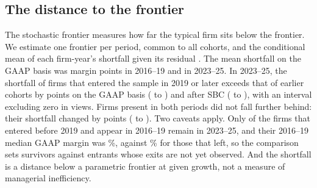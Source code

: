 \subsection{The distance to the frontier}
The stochastic frontier measures how far the typical firm sits below the frontier. We estimate one frontier per period, common to all cohorts, and the conditional mean of each firm-year's shortfall given its residual \citep{jondrow1982estimation}. The mean shortfall on the GAAP basis was \SfaEarly{} margin points in 2016--19 and \SfaLate{} in 2023--25. In 2023--25, the shortfall of firms that entered the sample in 2019 or later exceeds that of earlier cohorts by \SfaCohortOp{} points on the GAAP basis (\SfaCohortOpLo{} to \SfaCohortOpHi) and \SfaCohortCash{} after SBC (\SfaCohortCashLo{} to \SfaCohortCashHi), with an interval excluding zero in \SfaCohortCount{} views. Firms present in both periods did not fall further behind: their shortfall changed by \SfaBalanced{} points (\SfaBalancedLo{} to \SfaBalancedHi). Two caveats apply. Only \SfaStill{} of the \SfaPreFirms{} firms that entered before 2019 and appear in 2016--19 remain in 2023--25, and their 2016--19 median GAAP margin was \SfaSurvMargin\%, against \SfaLeaveMargin\% for those that left, so the comparison sets survivors against entrants whose exits are not yet observed. And the shortfall is a distance below a parametric frontier at given growth, not a measure of managerial inefficiency.


